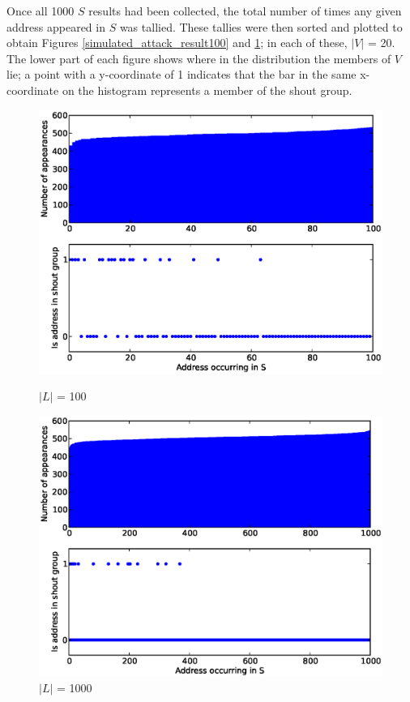 \documentclass[ %
                    author={Luke Murray},
                supervisor={Dr. Simon Hollis},
                     title={Shadow Peer-to-Peer Networks},
                  subtitle={},
                    degree={MEng},
                      year={2013} ]{thesis}
\begin{document}
Once all 1000 $S$ results had been collected, the total number of times any given address appeared in $S$ was tallied. These tallies were then sorted and plotted to obtain Figures \ref{simulated_attack_result100} and \ref{simulated_attack_result1000}; in each of these, $|V|$ = 20. The lower part of each figure shows where in the distribution the members of $V$ lie; a point with a y-coordinate of 1 indicates that the bar in the same x-coordinate on the histogram represents a member of the shout group.

\begin{figure}[h]
    \centering
    \begin{minipage}[b]{0.45\linewidth}
        \centering
        \includegraphics[width=\linewidth]{diagrams/split100.eps}
        \caption{$|L|$ = 100}
        \label{simulated_attack_result100}
    \end{minipage}
    \hspace{0.5cm}
    \begin{minipage}[b]{0.45\linewidth}
        \centering
        \includegraphics[width=\linewidth]{diagrams/split1000.eps}
        \caption{$|L|$ = 1000}
        \label{simulated_attack_result1000}
    \end{minipage}
\end{figure}
\end{document}
